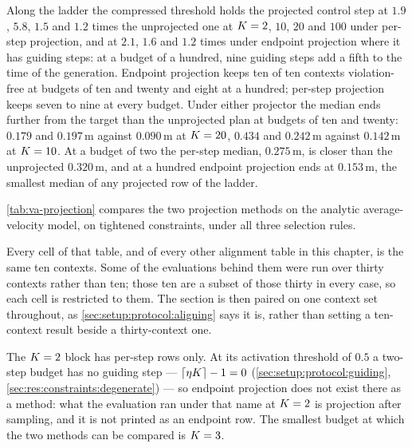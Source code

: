 Along the ladder the compressed threshold holds the projected control step at $1.9$, $5.8$, $1.5$ and
$1.2$ times the unprojected one at $K=2$, $10$, $20$ and $100$ under per-step projection, and at $2.1$,
$1.6$ and $1.2$ times under endpoint projection where it has guiding steps: at a budget of a hundred,
nine guiding steps add a fifth to the time of the generation. Endpoint projection keeps ten of ten contexts
violation-free at budgets of ten and twenty and eight at a hundred; per-step projection keeps seven to nine at
every budget. Under either projector the median ends further from the target than the unprojected plan at
budgets of ten and twenty: $0.179$ and $0.197$\,m against $0.090$\,m at $K=20$, $0.434$ and $0.242$\,m
against $0.142$\,m at $K=10$. At a budget of two the per-step median, $0.275$\,m, is closer than the
unprojected $0.320$\,m, and at a hundred endpoint projection ends at $0.153$\,m, the smallest median of any
projected row of the ladder.


\autoref{tab:va-projection} compares the two projection methods on the analytic average-velocity model,
on tightened constraints, under all three selection rules.

Every cell of that table, and of every other alignment table in this chapter, is the same ten contexts.
Some of the evaluations behind them were run over thirty contexts rather than ten; those ten are a subset
of those thirty in every case, so each cell is restricted to them. The section is then paired on one
context set throughout, as \autoref{sec:setup:protocol:aligning} says it is, rather than setting a
ten-context result beside a thirty-context one.

The $K=2$ block has per-step rows only. At its activation threshold of $0.5$ a two-step budget has no
guiding step --- $\lceil \eta K\rceil - 1 = 0$ (\autoref{sec:setup:protocol:guiding},
\autoref{sec:res:constraints:degenerate}) --- so endpoint projection does not exist there as a method: what
the evaluation ran under that name at $K=2$ is projection after sampling, and it is not printed as an
endpoint row. The smallest budget at which the two methods can be compared is $K=3$.


